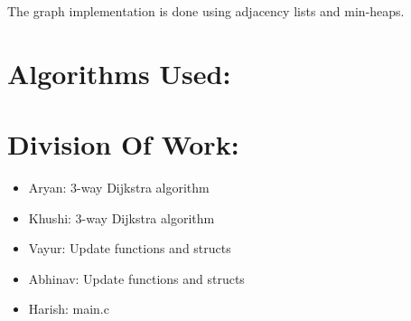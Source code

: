\documentclass{article}
\begin{document}
The graph implementation is done using adjacency lists and min-heaps.


\newpage
\section{Algorithms Used:}


\newpage
\section{Division Of Work:}
\begin{itemize}
    \item Aryan: 3-way Dijkstra algorithm

    \item Khushi: 3-way Dijkstra algorithm

    \item Vayur: Update functions and structs

\item Abhinav: Update functions and structs

\item Harish: main.c
\end{itemize}
\end{document}
